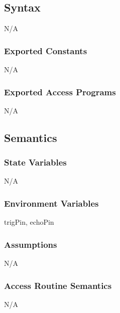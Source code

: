 \documentclass[12pt, titlepage]{article}
\begin{document}
\subsection{Syntax}
N/A
\subsubsection{Exported Constants}
N/A
\subsubsection{Exported Access Programs}

N/A

\subsection{Semantics}

\subsubsection{State Variables}

N/A

\subsubsection{Environment Variables}

trigPin, echoPin

\subsubsection{Assumptions}

N/A

\subsubsection{Access Routine Semantics}

N/A
\end{document}

